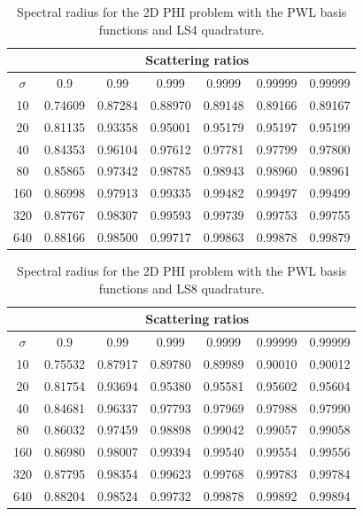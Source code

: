 \begin{table}
\caption{Spectral radius for the 2D PHI problem with the PWL basis functions and LS4 quadrature.}
\begin{center}
\def\arraystretch{1.6}
\begin{tabular}{|c|c|c|c|c|c|c|}
\hline
& \multicolumn{6}{c}{Scattering ratios}\vline\\
\hline
$\sigma$ & 0.9 & 0.99& 0.999& 0.9999& 0.99999& 0.99999 \\
\hline
10  &0.74609&0.87284&0.88970&0.89148&0.89166&0.89167\\
20  &0.81135&0.93358&0.95001&0.95179&0.95197&0.95199\\
40  &0.84353&0.96104&0.97612&0.97781&0.97799&0.97800\\
80  &0.85865&0.97342&0.98785&0.98943&0.98960&0.98961\\
160&0.86998&0.97913&0.99335&0.99482&0.99497&0.99499\\
320&0.87767&0.98307&0.99593&0.99739&0.99753&0.99755\\
640&0.88166&0.98500&0.99717&0.99863&0.99878&0.99879\\
\hline
\end{tabular}
\end{center}
\label{tab::DSA_2DPHI_LS4}
\end{table}

\begin{table}
\caption{Spectral radius for the 2D PHI problem with the PWL basis functions and LS8 quadrature.}
\begin{center}
\def\arraystretch{1.6}
\begin{tabular}{|c|c|c|c|c|c|c|}
\hline
& \multicolumn{6}{c}{Scattering ratios}\vline\\
\hline
$\sigma$ & 0.9 & 0.99& 0.999& 0.9999& 0.99999& 0.99999 \\
\hline
10  &0.75532&0.87917&0.89780&0.89989&0.90010&0.90012\\
20  &0.81754&0.93694&0.95380&0.95581&0.95602&0.95604\\
40  &0.84681&0.96337&0.97793&0.97969&0.97988&0.97990\\
80  &0.86032&0.97459&0.98898&0.99042&0.99057&0.99058\\
160&0.86980&0.98007&0.99394&0.99540&0.99554&0.99556\\
320&0.87795&0.98354&0.99623&0.99768&0.99783&0.99784\\
640&0.88204&0.98524&0.99732&0.99878&0.99892&0.99894\\
\hline
\end{tabular}
\end{center}
\label{tab::DSA_2DPHI_LS8}
\end{table}

